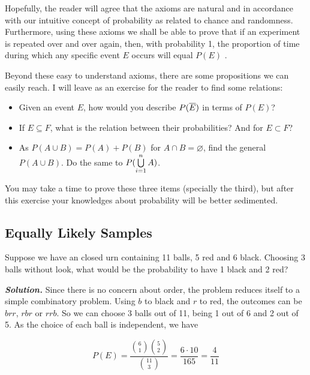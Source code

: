\documentclass[a4paper,twocolumn]{article}
\begin{document}
\bigskip

Hopefully, the reader will agree that the axioms are natural and in accordance with our intuitive concept of probability as related to chance and randomness. Furthermore, using these axioms we shall be able to prove that if an experiment is repeated over and over again, then, with probability 1, the proportion of time during which any specific event $E$ occurs will equal $P(E)$ \cite{ross_2010}.

Beyond these easy to understand axioms, there are some propositions we can easily reach. I will leave as an exercise for the reader to find some relations:

\begin{itemize}
    \item Given an event $E$, how would you describe $P(\overline{E})$ in terms of $P(E)$?
    \item If $E \subseteq F$, what is the relation between their probabilities? And for $E \subset F$?
    \item As $P(A \cup B) = P(A) + P(B)$ for $A \cap B = \varnothing$, find the general $P(A \cup B)$. Do the same to $P(\bigcup\limits_{i=1}^{n}A)$.
\end{itemize}

\noindent You may take a time to prove these three items (specially the third), but after this exercise your knowledges about probability will be better sedimented.


\subsection{Equally Likely Samples}

Suppose we have an closed urn containing 11 balls, 5 red and 6 black. Choosing 3 balls without look, what would be the probability to have 1 black and 2 red?

\bigskip

\noindent\textbf{\textit{Solution.}} Since there is no concern about order, the problem reduces itself to a simple combinatory problem. Using $b$ to black and $r$ to red, the outcomes can be $brr$, $rbr$ or $rrb$. So we can choose 3 balls out of 11, being 1 out of 6 and 2 out of 5. As the choice of each ball is independent, we have

\begin{equation}
\label{eq:balls_problem}
P(E) = \frac{\binom{6}{1}\binom{5}{2}}{\binom{11}{3}} = \frac{6 \cdot 10}{165} = \frac{4}{11}
\end{equation}
\end{document}
